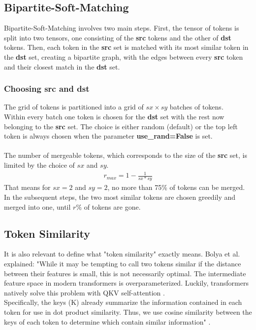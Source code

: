 \subsection{Bipartite-Soft-Matching}
Bipartite-Soft-Matching involves two main steps. First, the tensor of tokens is split into two tensors, one consisting of the \textbf{src} tokens and the other of \textbf{dst} tokens. Then, each token in the \textbf{src} set is matched with its most similar token in the \textbf{dst} set, creating a bipartite graph, with the edges between every \textbf{src} token and their closest match in the \textbf{dst} set. 



\subsubsection*{Choosing src and dst}
The grid of tokens is partitioned into a grid of \(sx \times sy\) batches of tokens.\\
Within every batch one token is chosen for the \textbf{dst} set with the rest now belonging to the \textbf{src} set. The choice is either random (default) or the top left token is always chosen when the parameter \textbf{use\_rand=False} is set.\\
\\
The number of mergeable tokens, which corresponds to the size of the \textbf{src} set, is limited by the choice of \(sx\) and \(sy\).
\begin{align*}
    r_{max} = 1-\frac{1}{sx*sy}
\end{align*}
That means for \(sx = 2\) and \(sy = 2\), no more than 75\% of tokens can be merged.\\
In the subsequent steps, the two most similar tokens are chosen greedily and merged into one, until \(r\%\) of tokens are gone.



\subsection{Token Similarity}
It is also relevant to define what "token similarity" exactly means. Bolya et al. explained: "While it may be tempting to call two tokens similar if the distance between their features is small, this is not necessarily optimal. The intermediate feature space in modern transformers is overparameterized. Luckily, transformers natively solve this problem with QKV self-attention \cite{vaswani2017attention}.\\
Specifically, the keys (K) already summarize the information contained in each token for use in dot product similarity. Thus, we use cosine similarity between the keys of each token to determine which contain similar information" \cite{bolya2023tome}.




